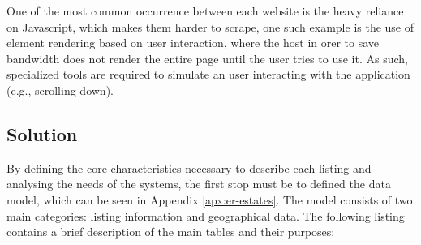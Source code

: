 One of the most common occurrence between each website is the heavy reliance on Javascript, which makes them harder to scrape, one such example is the use of element rendering based on user interaction, where the host in orer to save bandwidth does not render the entire page until the user tries to use it. As such, specialized tools are required to simulate an user interacting with the application (e.g., scrolling down).







\subsection{Solution}
\label{s:scraping-solution}

By defining the core characteristics necessary to describe each listing and analysing the needs of the systems, the first stop must be to defined the data model, which can be seen in Appendix \ref{apx:er-estates}. The model consists of two main categories: listing information and geographical data. The following listing contains a brief description of the main tables and their purposes:

